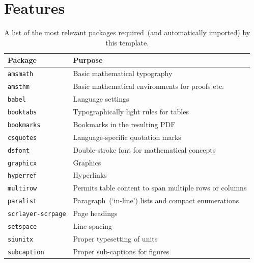 \section{Features}

\begin{table}
  \centering
  \begin{tabular}{ll}
    \toprule
    \textbf{Package}      & \textbf{Purpose}\\
    \midrule
      \texttt{amsmath}          & Basic mathematical typography\\
      \texttt{amsthm}           & Basic mathematical environments for proofs etc.\\
      \texttt{babel}            & Language settings\\
      \texttt{booktabs}         & Typographically light rules for tables\\
      \texttt{bookmarks}        & Bookmarks in the resulting PDF\\
      \texttt{csquotes}         & Language-specific quotation marks\\
      \texttt{dsfont}           & Double-stroke font for mathematical concepts\\
      \texttt{graphicx}         & Graphics\\
      \texttt{hyperref}         & Hyperlinks\\
      \texttt{multirow}         & Permits table content to span multiple rows or columns\\ 
      \texttt{paralist}         & Paragraph~(`in-line') lists and compact enumerations\\
      \texttt{scrlayer-scrpage} & Page headings\\
      \texttt{setspace}         & Line spacing\\
      \texttt{siunitx}          & Proper typesetting of units\\
      \texttt{subcaption} & Proper sub-captions for figures\\
    \bottomrule
  \end{tabular}
  \caption{%
    A list of the most relevant packages required~(and automatically imported) by this template.
  }
  \label{tab:Packages}
\end{table}

